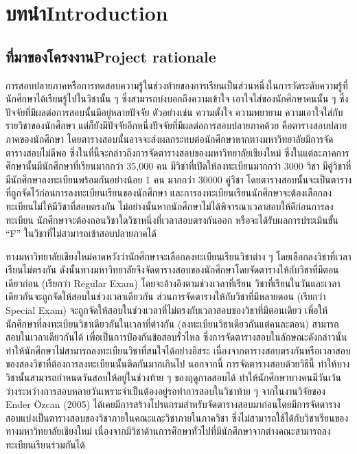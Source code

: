\chapter{\ifcpe บทนำ\else Introduction\fi}

\section{\ifcpe ที่มาของโครงงาน\else Project rationale\fi}
\label{sec:project_rationale}


การสอบปลายภาคหรือการทดสอบความรู้ในช่วงท้ายของการเรียนเป็นส่วนหนึ่งในการวัดระดับความรู้ที่นักศึกษาได้เรียนรู้ไปในวิชานั้น ๆ
ซึ่งสามารถบ่งบอกถึงความเข้าใจ เอาใจใส่ของนักศึกษาคนนั้น ๆ ซึ่งปัจจัยที่มีผลต่อการสอบนั้นมีอยู่หลายปัจจัย
ตัวอย่างเช่น ความตั้งใจ ความพยายาม ความเอาใจใส่กับรายวิชาของนักศึกษา
แต่ก็ยังมีปัจจัยอีกหนึ่งปัจจัยที่มีผลต่อการสอบปลายภาคด้วย คือตารางสอบปลายภาคของนักศึกษา
โดยตารางสอบนั้นอาจจะส่งผลกระทบต่อนักศึกษาหากทางมหาวิทยาลัยมีการจัดตารางสอบไม่ดีพอ
ซึ่งในที่นี้จะกล่าวถึงการจัดตารางสอบของมหาวิทยาลัยเชียงใหม่ ซึ่งในแต่ละภาคการศึกษานั้นมีนักศึกษาที่เรียนมากกว่า 35,000 คน 
มีวิชาที่เปิดให้ลงทะเบียนมากกว่า 3000 วิชา มีคู่วิชาที่มีนักศึกษาลงทะเบียนพร้อมกันอย่างน้อย 1 คน มากกว่า 30000 คู่วิชา 
โดยตารางสอบนั้นจะเป็นตารางที่ถูกจัดไว้ก่อนการลงทะเบียนเรียนของนักศึกษา 
และการลงทะเบียนเรียนนักศึกษาจะต้องเลือกลงทะเบียนไม่ให้มีวิชาที่สอบตรงกัน
ไม่อย่างนั้นหากนักศึกษาไม่ได้พิจารณาเวลาสอบให้ดีก่อนการลงทะเบียน นักศึกษาจะต้องถอนวิชาใดวิชาหนึ่งที่เวลาสอบตรงกันออก
หรือจะได้รับผลการประเมินขั้น ``F'' ในวิชาที่ไม่สามารถเข้าสอบปลายภาคได้


ทางมหาวิทยาลัยเชียงใหม่คาดหวังว่านักศึกษาจะเลือกลงทะเบียนเรียนวิชาต่าง ๆ
โดยเลือกลงวิชาที่เวลาเรียนไม่ตรงกัน ดังนั้นทางมหาวิทยาลัยจึงจัดตารางสอบของนักศึกษาโดยจัดตารางให้กับวิชาที่มีตอนเดียวก่อน
(เรียกว่า Regular Exam) โดยจะอ้างอิงตามช่วงเวลาที่เรียน วิชาที่เรียนในวันและเวลาเดียวกันจะถูกจัดให้สอบในช่วงเวลาเดียวกัน
ส่วนการจัดตารางให้กับวิชาที่มีหลายตอน (เรียกว่า Special Exam) จะถูกจัดให้สอบในช่วงเวลาที่ไม่ตรงกับเวลาสอบของวิชาที่มีตอนเดียว
เพื่อให้นักศึกษาที่ลงทะเบียนวิชาเดียวกันในเวลาที่ต่างกัน  (ลงทะเบียนวิชาเดียวกันแต่คนละตอน) สามารถสอบในเวลาเดียวกันได้
เพื่อเป็นการป้องกันข้อสอบรั่วไหล ซึ่งการจัดตารางสอบในลักษณะดังกล่าวนั้นทําให้นักศึกษาไม่สามารถลงทะเบียนวิชาที่สนใจได้อย่างอิสระ
เนื่องจากตารางสอบตรงกันหรือเวลาสอบของสองวิชาที่ต้องการลงทะเบียนนั้นติดกันมากเกินไป 
นอกจากนี้ การจัดตารางสอบด้วยวิธีนี้ ทำให้บางวิชานั้นสามารถกําหนดวันสอบให้อยู่ในช่วงท้าย ๆ ของฤดูกาลสอบได้ 
ทําให้นักศึกษาบางคนมีวันเว้นว่างระหว่างการสอบหลายวันเพราะจําเป็นต้องอยู่รอทำการสอบในวิชาท้าย ๆ
จากในงานวิจัยของ Ender {\"O}zcan (2005)\cite{fes} ได้เคยมีการสร้างโปรแกรมสำหรับจัดตารางสอบมาก่อนโดยมีการจัดตารางสอบแบ่งเป็นตารางสอบของวิชาภายในคณะและวิชาภายในภาควิชา 
ซึ่งไม่สามารถใช้ได้กับวิชาเรียนของทางมหาวิทยาลัยเชียงใหม่ 
เนื่องจากมีวิชาด้านการศึกษาทั่วไปที่มีนักศึกษาจากต่างคณะสามารถลงทะเบียนเรียนร่วมกันได้


